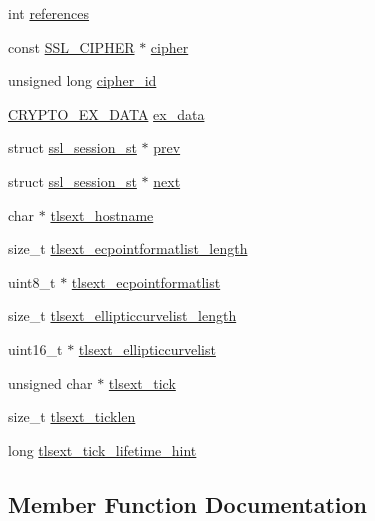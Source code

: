 \begin{DoxyCompactItemize}
\item 
int \hyperlink{structssl__session__st_a1b4fccb7a3ccf9f1521896f8bc900801}{references}
\item 
const \hyperlink{ssl_8h_a548d7a5d565a9e0e9bd45c49f8c95701}{S\+S\+L\+\_\+\+C\+I\+P\+H\+ER} $\ast$ \hyperlink{structssl__session__st_ad28c676df9d108256549b35af21488ea}{cipher}
\item 
unsigned long \hyperlink{structssl__session__st_a8701f3c1016dda3c59248560eaaddeb6}{cipher\+\_\+id}
\item 
\hyperlink{ossl__typ_8h_a7eaff1c18057495d8af18f22d1370b51}{C\+R\+Y\+P\+T\+O\+\_\+\+E\+X\+\_\+\+D\+A\+TA} \hyperlink{structssl__session__st_a1a25c1960884dde3163cc9f98ec942fe}{ex\+\_\+data}
\item 
struct \hyperlink{structssl__session__st}{ssl\+\_\+session\+\_\+st} $\ast$ \hyperlink{structssl__session__st_a3fa9d04e95c8c04a1ef6b6d87d69fed8}{prev}
\item 
struct \hyperlink{structssl__session__st}{ssl\+\_\+session\+\_\+st} $\ast$ \hyperlink{structssl__session__st_accaac56bcf65fe7626e21071e3253d0e}{next}
\item 
char $\ast$ \hyperlink{structssl__session__st_a693a87dae0162e6460ab909deeb865f0}{tlsext\+\_\+hostname}
\item 
size\+\_\+t \hyperlink{structssl__session__st_a68fdb9481f7593215ad42878c84871ba}{tlsext\+\_\+ecpointformatlist\+\_\+length}
\item 
uint8\+\_\+t $\ast$ \hyperlink{structssl__session__st_a8992e3b7e8d88d1a477b4af0a98f5ee5}{tlsext\+\_\+ecpointformatlist}
\item 
size\+\_\+t \hyperlink{structssl__session__st_a848919a20017cf2a1719d68f2c2ab5aa}{tlsext\+\_\+ellipticcurvelist\+\_\+length}
\item 
uint16\+\_\+t $\ast$ \hyperlink{structssl__session__st_a26ee916e4d1ea7cebca82c96a2754a87}{tlsext\+\_\+ellipticcurvelist}
\item 
unsigned char $\ast$ \hyperlink{structssl__session__st_a061e6eca821a577ac647c1990ad8abb4}{tlsext\+\_\+tick}
\item 
size\+\_\+t \hyperlink{structssl__session__st_a8858f901b65590fa8a077c2ef6f8aef1}{tlsext\+\_\+ticklen}
\item 
long \hyperlink{structssl__session__st_a8c4421410ed55e716ab61e143f636f24}{tlsext\+\_\+tick\+\_\+lifetime\+\_\+hint}
\end{DoxyCompactItemize}


\subsection{Member Function Documentation}
